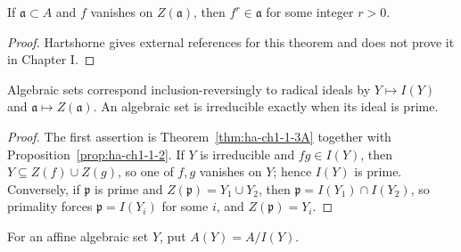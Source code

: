 \begin{theorem}
\label{thm:ha-ch1-1-3A}
\leanok
If $\mathfrak a\subset A$ and $f$ vanishes on $Z(\mathfrak a)$, then $f^r\in\mathfrak a$
for some integer $r>0$.
\end{theorem}
\begin{proof}
Hartshorne gives external references for this theorem and does not prove it in Chapter I.
\end{proof}

\begin{corollary}
\label{cor:ha-ch1-1-4}
\leanok
Algebraic sets correspond inclusion-reversingly to radical ideals by $Y\mapsto I(Y)$ and
$\mathfrak a\mapsto Z(\mathfrak a)$.  An algebraic set is irreducible exactly when its ideal is prime.
\end{corollary}
\begin{proof}
The first assertion is Theorem~\ref{thm:ha-ch1-1-3A} together with Proposition~\ref{prop:ha-ch1-1-2}.
If $Y$ is irreducible and $fg\in I(Y)$, then $Y\subseteq Z(f)\cup Z(g)$, so one of $f,g$
vanishes on $Y$; hence $I(Y)$ is prime.  Conversely, if $\mathfrak p$ is prime and
$Z(\mathfrak p)=Y_1\cup Y_2$, then $\mathfrak p=I(Y_1)\cap I(Y_2)$, so primality forces
$\mathfrak p=I(Y_i)$ for some $i$, and $Z(\mathfrak p)=Y_i$.
\end{proof}

\begin{definition}
\label{def:ha-ch1-affine-coordinate}
For an affine algebraic set $Y$, put $A(Y)=A/I(Y)$.
\end{definition}

